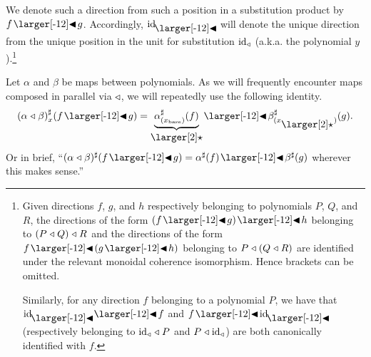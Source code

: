 \documentclass{amsart}
\begin{document}
We denote such a direction from such a position in a substitution
product by $f \subd g$. Accordingly, $\idsubd$ will denote the unique
direction from the unique position in the unit for substitution
$\mathrm{id}_{\mathrel{\triangleleft}}$ (a.k.a. the polynomial $y$).\footnote{Given directions $f$,
  $g$, and $h$ respectively belonging to polynomials $P$, $Q$, and
  $R$, the directions of the form $(f \subd g)\subd h$ belonging to
  $(P \mathrel{\triangleleft} Q) \mathrel{\triangleleft} R$ and the directions of the form
  $f \subd (g \subd h)$ belonging to $P \mathrel{\triangleleft} (Q \mathrel{\triangleleft} R)$ are
  identified under the relevant monoidal coherence isomorphism. Hence
  brackets can be omitted.

  Similarly, for any direction $f$ belonging to a polynomial $P$, we
  have that $\idsubd \subd f$ and $f \subd \idsubd$ (respectively
  belonging to $\mathrm{id}_{\mathrel{\triangleleft}} \mathrel{\triangleleft} P$ and $P \mathrel{\triangleleft} \mathrm{id}_{\mathrel{\triangleleft}}$) are both
  canonically identified with $f$.}

Let $\alpha$ and $\beta$ be maps between polynomials. As we will
frequently encounter maps composed in parallel via $\mathrel{\triangleleft}$, we will
repeatedly use the following identity.
\[\dirmap{(\alpha \sub \beta)}{x}{f \subd g} = \underbrace{\dirmap{\alpha}{(x_\base)}{f}}_{\backref}
  \subd \dirmap{\beta}{(x_{\backref})}{g}.\]
Or in brief,
``$(\alpha \sub \beta)^\sharp(f \subd g) = \alpha^\sharp(f)
\subd\beta^\sharp(g)$ wherever this makes sense.''
\end{document}

